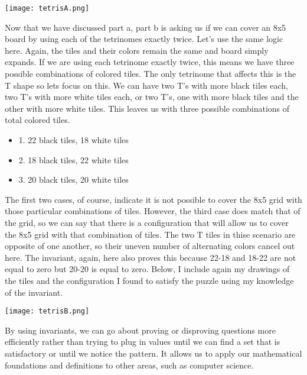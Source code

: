 \documentclass{article}
\theoremstyle{theorem}
\theoremstyle{definition}
\theoremstyle{remark}
\begin{document}
\begin{center}
  \texttt{[image: tetrisA.png]}
\end{center}

Now that we have discussed part a, part b is asking us if we can cover an 8x5 board by using each of the tetrinomes exactly twice. Let's use the same logic here. Again, the tiles and their colors remain the same and board simply expands. 
If we are using each tetrinome exactly twice, this means we have three possible combinations of colored tiles. The only tetrinome that affects this is the T shape so lets focus on this. We can have two T's with more black tiles each, two T's with more white tiles each, or 
two T's, one with more black tiles and the other with more white tiles. This leaves us with three possible combinations of total colored tiles. \\

\begin{itemize}
  \item 1. 22 black tiles, 18 white tiles 
  \item 2. 18 black tiles, 22 white tiles 
  \item 3. 20 black tiles, 20 white tiles
\end{itemize}

The first two cases, of course, indicate it is not possible to cover the 8x5 grid with those particular combinations of tiles. However, the third case does match that of the grid, so we can say that there is a configuration that will allow us to cover the 8x5 grid with that 
combination of tiles. The two T tiles in thise scenario are opposite of one another, so their uneven number of alternating colors cancel out here. The invariant, again, here also proves this because 22-18 and 18-22 are not equal to zero but 20-20 is equal to zero. Below, I include 
again my drawings of the tiles and the configuration I found to satisfy the puzzle using my knowledge of the invariant. \\

\begin{center}
  \texttt{[image: tetrisB.png]}
\end{center}

By using invariants, we can go about proving or disproving questions more efficiently rather than trying to plug in values until we can find a set that is satisfactory or until we notice the pattern. It allows us to apply our mathematical foundations and definitions to other areas, 
such as computer science. 
\end{document}
